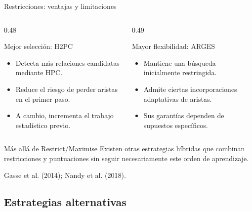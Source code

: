 \documentclass[aspectratio=169,11pt]{beamer}
\begin{document}
\begin{frame}[t]{Restricciones: ventajas y limitaciones}
  \begin{columns}[T,onlytextwidth]

    \begin{column}{0.48\textwidth}
      \begin{block}{Mejor selección: H2PC}
        \begin{itemize}
          \item Detecta más relaciones candidatas mediante HPC.
          \item Reduce el riesgo de perder aristas en el primer paso.
          \item A cambio, incrementa el trabajo estadístico previo.
        \end{itemize}
      \end{block}
    \end{column}

    \begin{column}{0.49\textwidth}
      \begin{block}{Mayor flexibilidad: ARGES}
        \begin{itemize}
          \item Mantiene una búsqueda inicialmente restringida.
          \item Admite ciertas incorporaciones adaptativas de aristas.
          \item Sus garantías dependen de supuestos específicos.
        \end{itemize}
      \end{block}
    \end{column}

  \end{columns}

  \vspace{0.2cm}

  \begin{block}{Más allá de Restrict/Maximise}
    Existen otras estrategias híbridas que combinan
    restricciones y puntuaciones sin seguir necesariamente
    este orden de aprendizaje.
  \end{block}

  {\scriptsize\color{upmgray}
  Gasse et al. (2014); Nandy et al. (2018).}
\end{frame}

\subsection{Estrategias alternativas}
\end{document}
